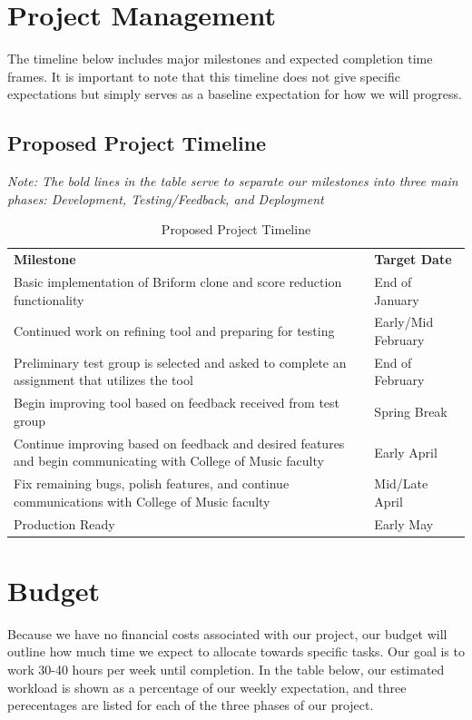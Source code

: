 \documentclass[12pt, letterpaper]{article}
\begin{document}
\section*{Project Management}
The timeline below includes major milestones and expected completion time frames.  It is important to note that this timeline does not give specific expectations but simply serves as a baseline expectation for how we will progress.

\subsection*{Proposed Project Timeline}
\textit{Note: The bold lines in the table serve to separate our milestones into three main phases: Development, Testing/Feedback, and Deployment}
\begin{table}[h!]
\caption{Proposed Project Timeline}
\centering
\begin{tabular}{|p{8cm}|p{4cm}|}
\hline
\textbf{Milestone} & \textbf{Target Date} \\
\Xhline{4\arrayrulewidth}
Basic implementation of Briform clone and score reduction functionality & End of January \\
\hline
Continued work on refining tool and preparing for testing & Early/Mid February \\
\Xhline{4\arrayrulewidth}
Preliminary test group is selected and asked to complete an assignment that utilizes the tool & End of February \\
\hline
Begin improving tool based on feedback received from test group & Spring Break \\
\Xhline{4\arrayrulewidth}
Continue improving based on feedback and desired features and begin communicating with College of Music faculty & Early April \\
\hline
Fix remaining bugs, polish features, and continue communications with College of Music faculty & Mid/Late April \\
\hline
Production Ready & Early May \\
\hline
\end{tabular}
\end{table}

\pagebreak

\section*{Budget}
Because we have no financial costs associated with our project, our budget will outline how much time we expect to allocate towards specific tasks.  Our goal is to work 30-40 hours per week until completion.  In the table below, our estimated workload is shown as a percentage of our weekly expectation, and three perecentages are listed for each of the three phases of our project.  
\end{document}
